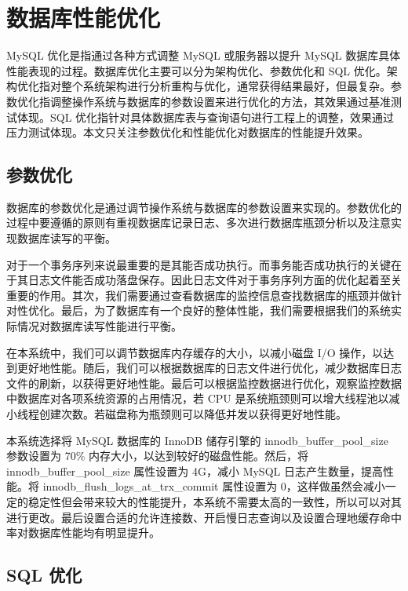 \section{数据库性能优化}

MySQL 优化是指通过各种方式调整 MySQL 或服务器以提升 MySQL 数据库具体性能表现的过程。数据库优化主要可以分为架构优化、参数优化和 SQL 优化。架构优化指对整个系统架构进行分析重构与优化，通常获得结果最好，但最复杂。参数优化指调整操作系统与数据库的参数设置来进行优化的方法，其效果通过基准测试体现。SQL 优化指针对具体数据库表与查询语句进行工程上的调整，效果通过压力测试体现。本文只关注参数优化和性能优化对数据库的性能提升效果。

\subsection{参数优化}

数据库的参数优化\cite{schwartz2012high}是通过调节操作系统与数据库的参数设置来实现的。参数优化的过程中要遵循的原则有重视数据库记录日志、多次进行数据库瓶颈分析以及注意实现数据库读写的平衡。

对于一个事务序列来说最重要的是其能否成功执行。而事务能否成功执行的关键在于其日志文件能否成功落盘保存。因此日志文件对于事务序列方面的优化起着至关重要的作用。其次，我们需要通过查看数据库的监控信息查找数据库的瓶颈并做针对性优化。最后，为了数据库有一个良好的整体性能，我们需要根据我们的系统实际情况对数据库读写性能进行平衡。

在本系统中，我们可以调节数据库内存缓存的大小，以减小磁盘 I/O 操作，以达到更好地性能。随后，我们可以根据数据库的日志文件进行优化，减少数据库日志文件的刷新，以获得更好地性能。最后可以根据监控数据进行优化，观察监控数据中数据库对各项系统资源的占用情况，若 CPU 是系统瓶颈则可以增大线程池以减小线程创建次数。若磁盘称为瓶颈则可以降低并发以获得更好地性能。

本系统选择将 MySQL 数据库的 InnoDB\cite{姜承尧2011mysql} 储存引擎的 innodb\_buffer\_pool\_size 参数设置为 70\% 内存大小，以达到较好的磁盘性能。然后，将 innodb\_buffer\_pool\_size 属性设置为 4G，减小 MySQL 日志产生数量，提高性能。将 innodb\_flush\_logs\_at\_trx\_commit 属性设置为 0，这样做虽然会减小一定的稳定性但会带来较大的性能提升，本系统不需要太高的一致性，所以可以对其进行更改。最后设置合适的允许连接数、开启慢日志查询以及设置合理地缓存命中率对数据库性能均有明显提升。


\subsection{SQL 优化}

